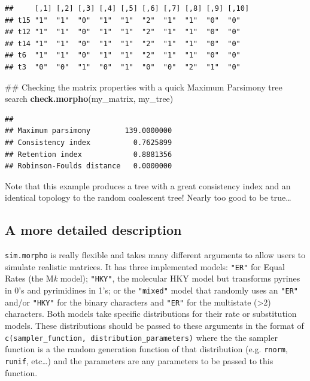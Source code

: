 \documentclass[]{book}
\newenvironment{Shaded}{\begin{snugshade}}{\end{snugshade}}
\newcommand{\KeywordTok}[1]{\textcolor[rgb]{0.13,0.29,0.53}{\textbf{#1}}}
\newcommand{\NormalTok}[1]{#1}
\theoremstyle{definition}
\theoremstyle{definition}
\theoremstyle{remark}
\begin{document}
\begin{verbatim}
##     [,1] [,2] [,3] [,4] [,5] [,6] [,7] [,8] [,9] [,10]
## t15 "1"  "1"  "0"  "1"  "1"  "2"  "1"  "1"  "0"  "0"  
## t12 "1"  "1"  "0"  "1"  "1"  "2"  "1"  "1"  "0"  "0"  
## t14 "1"  "1"  "0"  "1"  "1"  "2"  "1"  "1"  "0"  "0"  
## t6  "1"  "1"  "0"  "1"  "1"  "2"  "1"  "1"  "0"  "0"  
## t3  "0"  "0"  "1"  "0"  "1"  "0"  "0"  "2"  "1"  "0"
\end{verbatim}

\begin{Shaded}
\begin{Highlighting}[]
\NormalTok{## Checking the matrix properties with a quick Maximum Parsimony tree search}
\KeywordTok{check.morpho}\NormalTok{(my_matrix, my_tree)}
\end{Highlighting}
\end{Shaded}

\begin{verbatim}
##                                     
## Maximum parsimony        139.0000000
## Consistency index          0.7625899
## Retention index            0.8881356
## Robinson-Foulds distance   0.0000000
\end{verbatim}

Note that this example produces a tree with a great consistency index
and an identical topology to the random coalescent tree! Nearly too good
to be true\ldots{}

\subsection{A more detailed
description}\label{a-more-detailed-description}

\texttt{sim.morpho} is really flexible and takes many different
arguments to allow users to simulate realistic matrices. It has three
implemented models: \texttt{"ER"} for Equal Rates (the M\emph{k} model);
\texttt{"HKY"}, the molecular HKY model but transforms pyrines in 0's
and pyrimidines in 1's; or the \texttt{"mixed"} model that randomly uses
an \texttt{"ER"} and/or \texttt{"HKY"} for the binary characters and
\texttt{"ER"} for the multistate (\textgreater{}2) characters. Both
models take specific distributions for their rate or substitution
models. These distributions should be passed to these arguments in the
format of \texttt{c(sampler\_function,\ distribution\_parameters)} where
the the sampler function is a the random generation function of that
distribution (e.g. \texttt{rnorm}, \texttt{runif}, etc\ldots{}) and the
parameters are any parameters to be passed to this function.
\end{document}
